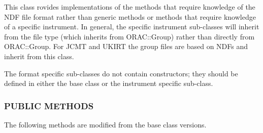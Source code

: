 This class rovides implementations of the methods that require
knowledge of the NDF file format rather than generic methods or
methods that require knowledge of a specific instrument.  In general,
the specific instrument sub-classes will inherit from the file type
(which inherits from ORAC::Group) rather than directly from
ORAC::Group. For JCMT and UKIRT the group files are based on NDFs and
inherit from this class.



The format specific sub-classes do not contain constructors; they
should be defined in either the base class or the instrument specific
sub-class.

\subsubsection*{PUBLIC METHODS\label{ORAC::Group::NDF_PUBLIC_METHODS}}


The following methods are modified from the base class versions.

